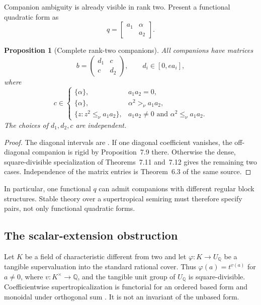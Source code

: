 \documentclass[11pt]{article}
\newtheorem{proposition}[theorem]{Proposition}
\theoremstyle{definition}
\theoremstyle{remark}
\newcommand{\Rationals}{\mathbb Q}
\begin{document}
Companion ambiguity is already visible in rank two.  Present a functional
quadratic form as
\[
 q=\begin{bmatrix}a_1&\alpha\\&a_2\end{bmatrix}.
\]

\begin{proposition}[Complete rank-two companions]\label{prop:supercompanion}
All companions have matrices
\[
 b=\begin{pmatrix}d_1&c\\c&d_2\end{pmatrix},
 \qquad d_i\in[0,ea_i],
\]
where
\[
 c\in
 \begin{cases}
 \{\alpha\},&a_1a_2=0,\\
 \{\alpha\},&\alpha^2>_\nu a_1a_2,\\
 \{z:z^2\le_\nu a_1a_2\},&a_1a_2\ne0\text{ and }
     \alpha^2\le_\nu a_1a_2.
 \end{cases}
\]
The choices of \(d_1,d_2,c\) are independent.
\end{proposition}

\begin{proof}
The diagonal intervals are
\cite[Proposition~6.12]{ikr2016qf1}.  If one diagonal coefficient vanishes,
the off-diagonal companion is rigid by Proposition~7.9 there.  Otherwise the
dense, square-divisible specialization of Theorems~7.11 and~7.12 gives the
remaining two cases.  Independence of the matrix entries is
Theorem~6.3 of the same source.
\end{proof}

In particular, one functional \(q\) can admit companions with different
regular block structures.  Stable theory over a supertropical semiring must
therefore specify pairs, not only functional quadratic forms.

\subsection{The scalar-extension obstruction}

Let \(K\) be a field of characteristic different from two and let
\(\varphi:K\to U_{\Rationals}\) be a tangible supervaluation into the standard
rational cover.  Thus \(\varphi(a)=t^{v(a)}\) for \(a\ne0\), where
\(v:K^\times\to\Rationals\), and the tangible unit group of
\(U_{\Rationals}\) is square-divisible.  Coefficientwise
supertropicalization is functorial for an ordered based form and monoidal under
orthogonal sum \cite[Definition~9.3]{ikr2016qf1}.  It is not an invariant of
the unbased form.
\end{document}
